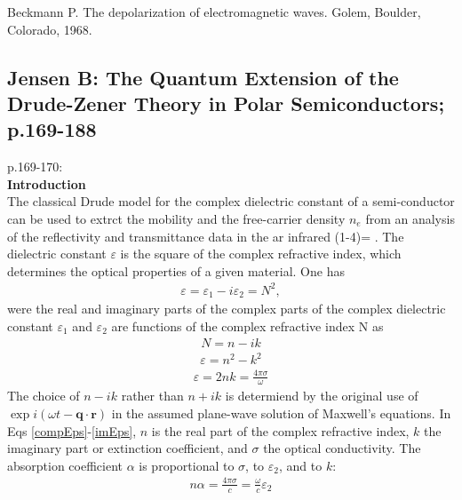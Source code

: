 \begin{thebibliography}{9}
      Beckmann P.
      The depolarization of electromagnetic waves.
      Golem, Boulder, Colorado, 1968.

\end{thebibliography}


\subsection{Jensen B: The Quantum Extension of the Drude-Zener Theory in Polar Semiconductors; p.169-188}
p.169-170:\\
\textbf{Introduction}\\
The classical Drude model for the complex dielectric constant of a semi-conductor can be used to
extrct the mobility and the free-carrier density $n_e$ from an analysis of the reflectivity and transmittance
data in the ar infrared (1-4)=
      \cite{Palik1979, Holm1977,Perkowitz1971,Perkowitz1974,Fan1967}.
The dielectric constant $\varepsilon$ is the square of the complex refractive
index, which determines the optical properties of a given material. One has
\begin{align}
   \varepsilon = \varepsilon_1 - i \varepsilon_2 = N^2,
   \label{compEps}
\end{align}
were the real and imaginary parts of the complex  parts of the complex dielectric constant $\varepsilon_1$ 
and $\varepsilon_2$ are functions of the complex refractive index N as
\begin{align}
   N = n -i k
\end{align}
\begin{align}
   \varepsilon = n^2 - k^2
\end{align}
\begin{align}
   \varepsilon = 2nk = \frac{4\pi \sigma}{\omega}
   \label{imEps}
\end{align}
The choice of $n-ik$ rather than $n+ik$ is determiend by the original use of 
$\exp i(\omega t - \boldsymbol q \cdot \boldsymbol r)$ in the assumed plane-wave solution of
Maxwell's equations.
In Eqs \eqref{compEps}-\eqref{imEps}, $n$ is the real part of the complex refractive index, $k$
the imaginary part or extinction coefficient, and $\sigma$ the optical conductivity. The
absorption coefficient $\alpha$ is proportional to $\sigma$, to $\varepsilon_2$, and to $k$:
\begin{align}
   n\alpha = \frac{4 \pi \sigma}{c} = \frac{\omega}{c} \varepsilon_2
\end{align}

